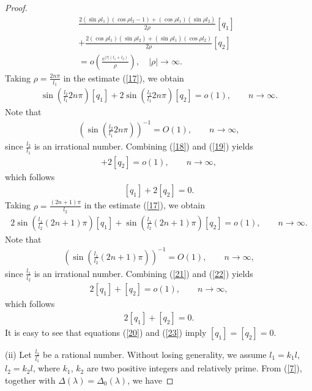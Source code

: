 \documentclass[reqno,11pt,centertags]{amsart}
\numberwithin{equation}{section}
\theoremstyle{definition}
\begin{document}
\begin{proof}
\begin{align}\label{17}
 \frac{2(\sin\rho l_{1})(\cos\rho l_{2}-1)+(\cos\rho l_{1})(\sin\rho l_{2})}{2\rho}[q_{1}] \nonumber \\
 +\frac{2(\cos\rho l_{1})(\sin\rho l_{2})+(\sin\rho l_{1})(\cos\rho l_{2})}{2\rho}[q_{2}] \quad\nonumber \\
 =o\left(\frac{e^{|\tau|(l_{1}+l_{2})}}{\rho}\right),\quad |\rho|\rightarrow\infty.\qquad\qquad\qquad\;
\end{align}
Taking $\rho=\frac{2n\pi}{l_{1}}$ in the estimate (\ref{17}), we obtain
\begin{align}\label{18}
 \sin\left(\frac{l_{2}}{l_{1}}2n\pi\right)[q_{1}]+2\sin\left(\frac{l_{2}}{l_{1}}2n\pi\right)[q_{2}]=o(1),\qquad n\rightarrow\infty.
\end{align}
Note that
\begin{align}\label{19}
 \left(\sin\left(\frac{l_{2}}{l_{1}}2n\pi\right)\right)^{-1}=O(1),\qquad n\rightarrow\infty,
\end{align}
since $\frac{l_{2}}{l_{1}}$ is an irrational number. Combining (\ref{18}) and (\ref{19}) yields
\begin{align}
 [q_{1}]+2[q_{2}]=o(1),\qquad n\rightarrow\infty, \nonumber
\end{align}
which follows
\begin{align}\label{20}
 [q_{1}]+2[q_{2}]=0.
\end{align}
Taking $\rho=\frac{(2n+1)\pi}{l_{2}}$ in the estimate (\ref{17}), we obtain
\begin{align}\label{21}
 2\sin\left(\frac{l_{1}}{l_{2}}(2n+1)\pi\right)[q_{1}]+\sin\left(\frac{l_{1}}{l_{2}}(2n+1)\pi\right)[q_{2}]=o(1),\qquad n\rightarrow\infty.
\end{align}
Note that
\begin{align}\label{22}
 \left(\sin\left(\frac{l_{1}}{l_{2}}(2n+1)\pi\right)\right)^{-1}=O(1),\qquad n\rightarrow\infty,
\end{align}
since $\frac{l_{1}}{l_{2}}$ is an irrational number.  Combining (\ref{21}) and (\ref{22}) yields
\begin{align}
 2[q_{1}]+[q_{2}]=o(1),\qquad n\rightarrow\infty, \nonumber
\end{align}
which follows
\begin{align}\label{23}
 2[q_{1}]+[q_{2}]=0.
\end{align}
It is easy to see that equations (\ref{20}) and (\ref{23}) imply $[q_{1}]=[q_{2}]=0$.

(ii) Let $\frac{l_{2}}{l_{1}}$ be a rational number. Without losing generality, we assume $l_{1}=k_{1}l$, $l_{2}=k_{2}l$, where $k_{1}$, $k_{2}$
are two positive integers and relatively prime. From (\ref{7}), together with $\Delta(\lambda)=\Delta_{0}(\lambda)$, we have


\end{proof}
\end{document}
